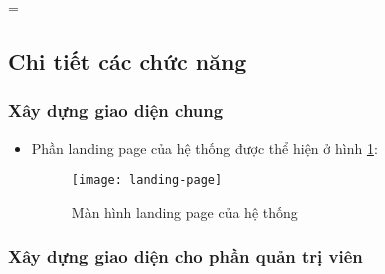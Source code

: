 =\documentclass[../Thesis.tex]{subfiles}
\begin{document}
    \subsection{Chi tiết các chức năng}
        \subsubsection{Xây dựng giao diện chung}
        \label{subsubsec:xay-dung-giao-dien-chung}
            \begin{itemize}
                \item Phần landing page của hệ thống được thể hiện ở hình \ref{fig:landing-page}:
                \begin{figure}[hbt!]
                    \centering\texttt{[image: landing-page]}
                    \caption{Màn hình landing page của hệ thống}
                    \label{fig:landing-page}
                \end{figure}
                \FloatBarrier

            \end{itemize}

        \subsubsection{Xây dựng giao diện cho phần quản trị viên}
        \label{subsubsec:xay-dung-giao-dien-admin}
        
\end{document}
